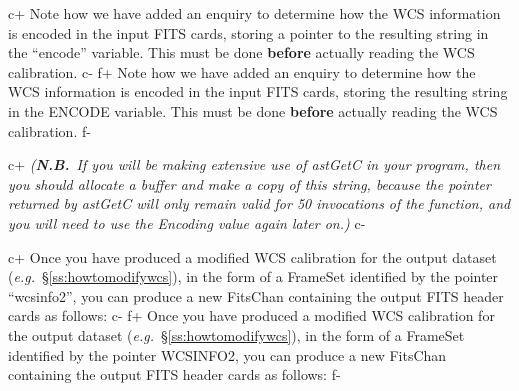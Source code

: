 \documentclass[twoside,11pt]{article}
\newcommand{\secref}[1]{\S\ref{#1}}
\newcommand{\secref}[1]{\ref{#1}}
\begin{document}
c+
Note how we have added an enquiry to determine how the WCS information
is encoded in the input FITS cards, storing a pointer to the resulting
string in the ``encode'' variable. This must be done {\bf{before}}
actually reading the WCS calibration.
c-
f+
Note how we have added an enquiry to determine how the WCS information
is encoded in the input FITS cards, storing the resulting string in
the ENCODE variable. This must be done {\bf{before}} actually reading
the WCS calibration.
f-

c+
{\em{({\bf{N.B.}}\ If you will be making extensive use of astGetC in
your program, then you should allocate a buffer and make a copy of
this string, because the pointer returned by astGetC will only remain
valid for 50 invocations of the function, and you will need to use the
Encoding value again later on.)}}
c-

c+
Once you have produced a modified WCS calibration for the output
dataset ({\em{e.g.}}\ \secref{ss:howtomodifywcs}), in the form of a
FrameSet identified by the pointer ``wcsinfo2'', you can produce a new
FitsChan containing the output FITS header cards as follows:
c-
f+
Once you have produced a modified WCS calibration for the output
dataset ({\em{e.g.}}\ \secref{ss:howtomodifywcs}), in the form of a
FrameSet identified by the pointer WCSINFO2, you can produce a new
FitsChan containing the output FITS header cards as follows:
f-
\end{document}
